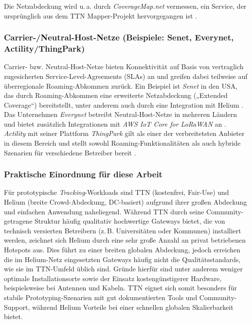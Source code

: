 Die Netzabdeckung wird u.\,a. durch \emph{CoverageMap.net} vermessen, ein Service, der ursprünglich aus dem TTN Mapper-Projekt hervorgegangen ist \autocite{TTNMapperDoc}.


\subsubsection*{Carrier-/Neutral-Host-Netze (Beispiele: Senet, Everynet, Actility/ThingPark)}
Carrier- bzw. Neutral-Host-Netze bieten Konnektivität auf Basis von vertraglich zugesicherten Service-Level-Agreements (SLAs) an und greifen dabei teilweise auf überregionale Roaming-Abkommen zurück. 
Ein Beispiel ist \emph{Senet} in den USA, das durch Roaming-Abkommen eine erweiterte Netzabdeckung („Extended Coverage“) bereitstellt, unter anderem auch durch eine Integration mit Helium \autocite{SenetExt}. 
Das Unternehmen \emph{Everynet} betreibt Neutral-Host-Netze in mehreren Ländern und bietet zusätzlich Integrationen mit \emph{AWS IoT Core for LoRaWAN} an \autocite{AWSPublic}. 
\emph{Actility} mit seiner Plattform \emph{ThingPark} gilt als einer der verbreitetsten Anbieter in diesem Bereich und stellt sowohl Roaming-Funktionalitäten als auch hybride Szenarien für verschiedene Betreiber bereit \autocite{ETSIEN3002202025}.


\subsubsection*{Praktische Einordnung für diese Arbeit}
Für prototypische \emph{Tracking}-Workloads sind TTN (kostenfrei, Fair-Use) und Helium (breite Crowd-Abdeckung, DC-basiert) aufgrund ihrer großen Abdeckung und einfachen Anwendung naheliegend. 
Während TTN durch seine Community-getragene Struktur häufig qualitativ hochwertige Gateways bietet, die von technisch versierten Betreibern (z.\,B. Universitäten oder Kommunen) installiert werden, zeichnet sich Helium durch eine sehr große Anzahl an privat betriebenen Hotspots aus. 
Dies führt zu einer breiten globalen Abdeckung, jedoch erreichen die im Helium-Netz eingesetzten Gateways häufig nicht die Qualitätsstandards, wie sie im TTN-Umfeld üblich sind. Gründe hierfür sind unter anderem weniger optimale Installationsorte sowie der Einsatz kostengünstigerer Hardware, beispielsweise bei Antennen und Kabeln.
TTN eignet sich somit besonders für stabile Prototyping-Szenarien mit gut dokumentierten Tools und Community-Support, während Helium Vorteile bei einer schnellen globalen Skalierbarkeit bietet. 
